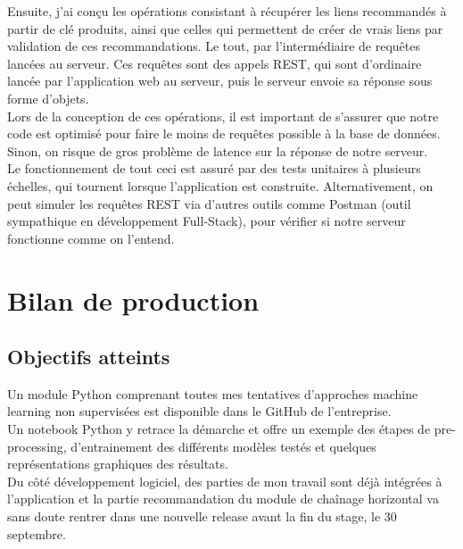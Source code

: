 \documentclass{rapportCS}
\begin{document}
Ensuite, j'ai conçu les opérations consistant à récupérer les liens recommandés à partir de clé produits,
ainsi que celles qui permettent de créer de vrais liens par validation de ces recommandations.
Le tout, par l'intermédiaire de requêtes lancées au serveur. Ces requêtes sont des appels REST, qui sont
d'ordinaire lancée par l'application web au serveur, puis le serveur envoie sa réponse sous forme d'objets.\\
Lors de la conception de ces opérations, il est important de s'assurer que notre code est optimisé pour
faire le moins de requêtes possible à la base de données.\\
Sinon, on risque de gros problème de latence sur la réponse de notre serveur.\\

Le fonctionnement de tout ceci est assuré par des tests unitaires à plusieurs échelles,
qui tournent lorsque l'application est construite.
Alternativement, on peut simuler les requêtes REST via d'autres outils comme Postman 
(outil sympathique en développement Full-Stack),
pour vérifier si notre serveur fonctionne comme on l'entend.\\

\newpage
\section{Bilan de production}
\subsection{Objectifs atteints}

Un module Python comprenant toutes mes tentatives d'approches machine learning non supervisées est
disponible dans le GitHub de l'entreprise.\\
Un notebook Python y retrace la démarche et offre un exemple des étapes de pre-processing, d'entrainement
des différents modèles testés et quelques représentations graphiques des résultats.\\

Du côté développement logiciel, des parties de mon travail sont déjà intégrées à l'application et la partie
recommandation du module de chaînage horizontal va sans doute rentrer dans une nouvelle release avant
la fin du stage, le 30 septembre.\\
\end{document}
